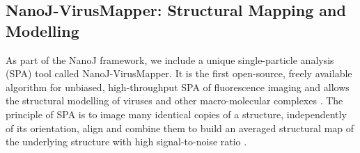 \subsection*{NanoJ-VirusMapper: Structural Mapping and Modelling}
 As part of the NanoJ framework, we include a unique single-particle analysis (SPA) tool called NanoJ-VirusMapper. It is the first open-source, freely available algorithm for unbiased, high-throughput SPA of fluorescence imaging and allows the structural modelling of viruses and other macro-molecular complexes \cite{gray2016virusmapper,gray2017open,gray2018nanoscale}. The principle of SPA is to image many identical copies of a structure, independently of its orientation, align and combine them to build an averaged structural map of the underlying structure with high signal-to-noise ratio \cite{Szymborska2013,laine2015structural,lelek2012superresolution} . 
 
